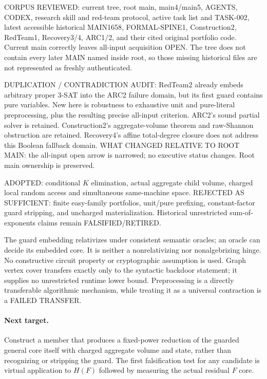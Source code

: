\documentclass[11pt]{article}
\begin{document}
CORPUS REVIEWED: current tree, root main, main4/main5, AGENTS, CODEX,
research skill and red-team protocol, active task list and TASK-002,
latest accessible historical MAIN1658, FORMAL-SPINE1, Construction2,
RedTeam1, Recovery3/4, ARC1/2, and their cited original portfolio code.
Current main correctly leaves all-input acquisition OPEN. The tree does
not contain every later MAIN named inside root, so those missing historical
files are not represented as freshly authenticated.

DUPLICATION / CONTRADICTION AUDIT: RedTeam2 already embeds arbitrary
proper 3-SAT into the ARC2 failure domain, but its first guard contains
pure variables. New here is robustness to exhaustive unit and pure-literal
preprocessing, plus the resulting precise all-input criterion. ARC2's
sound partial solver is retained. Construction2's aggregate-volume theorem
and raw-Shannon obstruction are retained. Recovery4's affine total-degree
closure does not address this Boolean fallback domain. WHAT CHANGED
RELATIVE TO ROOT MAIN: the all-input open arrow is narrowed; no executive
status changes. Root main ownership is preserved.

ADOPTED: conditional $K$ elimination, actual aggregate child volume,
charged local random access and simultaneous same-machine space.
REJECTED AS SUFFICIENT: finite easy-family portfolios, unit/pure prefixing,
constant-factor guard stripping, and uncharged materialization. Historical
unrestricted sum-of-exponents claims remain FALSIFIED/RETIRED.

The guard embedding relativizes under consistent semantic oracles; an
oracle can decide its embedded core. It is neither a nonrelativizing nor
nonalgebrizing hinge. No constructive circuit property or cryptographic
assumption is used. Graph vertex cover transfers exactly only to the
syntactic backdoor statement; it supplies no unrestricted runtime lower
bound. Preprocessing is a directly transferable algorithmic mechanism,
while treating it as a universal contraction is a FAILED TRANSFER.

\paragraph{Next target.}
Construct a member that produces a fixed-power reduction of the guarded
general core itself with charged aggregate volume and state, rather than
recognizing or stripping the guard. The first falsification test for any
candidate is virtual application to $H(F)$ followed by measuring the
actual residual $F$ core.

\end{document}

